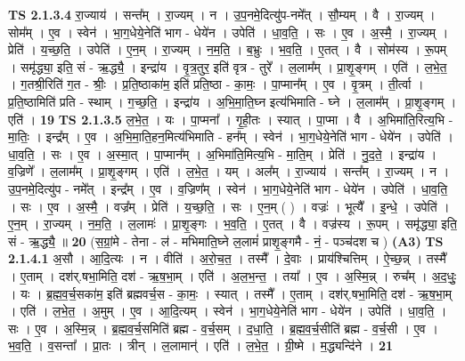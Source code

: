\documentclass[17pt]{extarticle}
\begin{document}
                  \newline
                                \textbf{ TS 2.1.3.4} \newline
                  रा॒ज्याय॑ । सन्त᳚म् । रा॒ज्यम् । न । उ॒प॒नमे॒दित्यु॑प-नमे᳚त् । सौ॒म्यम् । वै । रा॒ज्यम् । सोम᳚म् । ए॒व । स्वेन॑ । भा॒ग॒धेये॒नेति॑ भाग - धेये॑न । उपेति॑ । धा॒व॒ति॒ । सः । ए॒व । अ॒स्मै॒ । रा॒ज्यम् । प्रेति॑ । य॒च्छ॒ति॒ । उपेति॑ । ए॒न॒म् । रा॒ज्यम् । न॒म॒ति॒ । ब॒भ्रुः । भ॒व॒ति॒ । ए॒तत् । वै । सोम॑स्य । रू॒पम् । समृ॑द्ध्या॒ इति॒ सं - ऋ॒द्ध्यै॒ । इन्द्रा॑य । वृ॒त्र॒तुर॒ इति॑ वृत्र - तुरे᳚ । ल॒लाम᳚म् । प्रा॒शृ॒ङ्गम् । एति॑ । ल॒भे॒त॒ । ग॒तश्री॒रिति॑ ग॒त - श्रीः॒ । प्र॒ति॒ष्ठाका॑म॒ इति॑ प्रति॒ष्ठा - का॒मः॒ । पा॒प्मान᳚म् । ए॒व । वृ॒त्रम् । ती॒र्त्वा । प्र॒ति॒ष्ठामिति॑ प्रति - स्थाम् । ग॒च्छ॒ति॒ । इन्द्रा॑य । अ॒भि॒मा॒ति॒घ्न इत्य॑भिमाति - घ्ने । ल॒लाम᳚म् । प्रा॒शृ॒ङ्गम् । एति॑ । \textbf{  19} \newline
                  \newline
                                \textbf{ TS 2.1.3.5} \newline
                  ल॒भे॒त॒ । यः । पा॒प्मना᳚ । गृ॒ही॒तः । स्यात् । पा॒प्मा । वै । अ॒भिमा॑ति॒रित्य॒भि - मा॒तिः॒ । इन्द्र᳚म् । ए॒व । अ॒भि॒मा॒ति॒हन॒मित्य॑भिमाति - हन᳚म् । स्वेन॑ । भा॒ग॒धेये॒नेति॑ भाग - धेये॑न । उपेति॑ । धा॒व॒ति॒ । सः । ए॒व । अ॒स्मा॒त् । पा॒प्मान᳚म् । अ॒भिमा॑ति॒मित्य॒भि - मा॒ति॒म् । प्रेति॑ । नु॒द॒ते॒ । इन्द्रा॑य । व॒ज्रिणे᳚ । ल॒लाम᳚म् । प्रा॒शृ॒ङ्गम् । एति॑ । ल॒भे॒त॒ । यम् । अल᳚म् । रा॒ज्याय॑ । सन्त᳚म् । रा॒ज्यम् । न । उ॒प॒नमे॒दित्यु॑प - नमे᳚त् । इन्द्र᳚म् । ए॒व । व॒ज्रिण᳚म् । स्वेन॑ । भा॒ग॒धेये॒नेति॑ भाग - धेये॑न । उपेति॑ । धा॒व॒ति॒ । सः । ए॒व । अ॒स्मै॒ । वज्र᳚म् । प्रेति॑ । य॒च्छ॒ति॒ । सः । ए॒न॒म् ( ) । वज्रः॑ । भूत्यै᳚ । इ॒न्धे॒ । उपेति॑ । ए॒न॒म् । रा॒ज्यम् । न॒म॒ति॒ । ल॒लामः॑ । प्रा॒शृ॒ङ्गः । भ॒व॒ति॒ । ए॒तत् । वै । वज्र॑स्य । रू॒पम् । समृ॑द्ध्या॒ इति॒ सं - ऋ॒द्ध्यै॒ ॥ \textbf{  20 } \newline
                  \newline
                      (स॒ग्रां॒मे - तेना - ल॑ - मभिमाति॒घ्ने ल॒लामं॑ प्राशृ॒ङ्गमै - नं॒ - पञ्च॑दश च )  \textbf{(A3)} \newline \newline
                                \textbf{ TS 2.1.4.1} \newline
                  अ॒सौ । आ॒दि॒त्यः । न । वीति॑ । अ॒रो॒च॒त॒ । तस्मै᳚ । दे॒वाः । प्राय॑श्चित्तिम् । ऐ॒च्छ॒न्न् । तस्मै᳚ । ए॒ताम् । दश॑र्.षभा॒मिति॒ दश॑ - ऋ॒ष॒भा॒म् । एति॑ । अ॒ल॒भ॒न्त॒ । तया᳚ । ए॒व । अ॒स्मि॒न्न् । रुच᳚म् । अ॒द॒धुः॒ । यः । ब्र॒ह्म॒व॒र्च॒सका॑म॒ इति॑ ब्रह्मवर्च॒स - का॒मः॒ । स्यात् । तस्मै᳚ । ए॒ताम् । दश॑र्.षभा॒मिति॒ दश॑ - ऋ॒ष॒भा॒म् । एति॑ । ल॒भे॒त॒ । अ॒मुम् । ए॒व । आ॒दि॒त्यम् । स्वेन॑ । भा॒ग॒धेये॒नेति॑ भाग - धेये॑न । उपेति॑ । धा॒व॒ति॒ । सः । ए॒व । अ॒स्मि॒न्न् । ब्र॒ह्म॒व॒र्च॒समिति॑ ब्रह्म - व॒र्च॒सम् । द॒धा॒ति॒ । ब्र॒ह्म॒व॒र्च॒सीति॑ ब्रह्म - व॒र्च॒सी । ए॒व । भ॒व॒ति॒ । व॒सन्ता᳚ । प्रा॒तः । त्रीन् । ल॒लामान्॑ । एति॑ । ल॒भे॒त॒ । ग्री॒ष्मे । म॒द्ध्यन्दि॑ने । \textbf{  21} \newline
\end{document}
